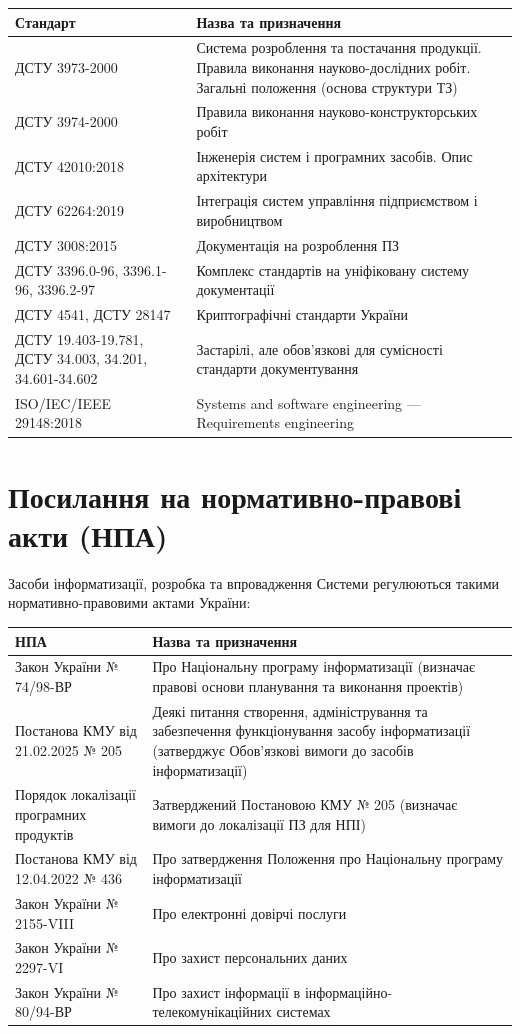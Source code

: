 \documentclass{article}
\begin{document}
\begin{longtable}{p{4cm}p{9cm}}
\toprule
\textbf{Стандарт} & \textbf{Назва та призначення} \\
\midrule
ДСТУ 3973-2000 & Система розроблення та постачання продукції. Правила виконання науково-дослідних робіт. Загальні положення (основа структури ТЗ) \\
ДСТУ 3974-2000 & Правила виконання науково-конструкторських робіт \\
ДСТУ 42010:2018 & Інженерія систем і програмних засобів. Опис архітектури \\
ДСТУ 62264:2019 & Інтеграція систем управління підприємством і виробництвом \\
ДСТУ 3008:2015 & Документація на розроблення ПЗ \\
ДСТУ 3396.0-96, 3396.1-96, 3396.2-97 & Комплекс стандартів на уніфіковану систему документації \\
ДСТУ 4541, ДСТУ 28147 & Криптографічні стандарти України \\
ДСТУ 19.403-19.781,
ДСТУ 34.003, 34.201, 34.601-34.602 & Застарілі, але обов’язкові для сумісності стандарти документування \\
ISO/IEC/IEEE 29148:2018 & Systems and software engineering — Requirements engineering \\
\bottomrule
\end{longtable}

\newpage
\section{Посилання на нормативно-правові акти (НПА)}

Засоби інформатизації, розробка та впровадження Системи регулюються такими нормативно-правовими актами України:

\begin{longtable}{p{4cm}p{9cm}}
\toprule
\textbf{НПА} & \textbf{Назва та призначення} \\
\midrule
Закон України № 74/98-ВР & Про Національну програму інформатизації (визначає правові основи планування та виконання проектів) \\
Постанова КМУ від 21.02.2025 № 205 & Деякі питання створення, адміністрування та забезпечення функціонування засобу інформатизації (затверджує Обов'язкові вимоги до засобів інформатизації) \\
Порядок локалізації програмних продуктів & Затверджений Постановою КМУ № 205 (визначає вимоги до локалізації ПЗ для НПІ) \\
Постанова КМУ від 12.04.2022 № 436 & Про затвердження Положення про Національну програму інформатизації \\
Закон України № 2155-VIII & Про електронні довірчі послуги \\
Закон України № 2297-VI & Про захист персональних даних \\
Закон України № 80/94-ВР & Про захист інформації в інформаційно-телекомунікаційних системах \\
\bottomrule
\end{longtable}
\end{document}
